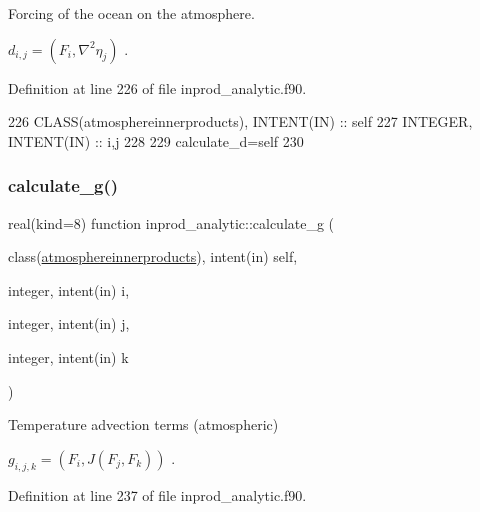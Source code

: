 Forcing of the ocean on the atmosphere. 

$ d_{i,j} = (F_i, \nabla^2 \eta_j)$ . 

Definition at line 226 of file inprod\+\_\+analytic.\+f90.


\begin{DoxyCode}
226     \textcolor{keywordtype}{CLASS}(atmosphereinnerproducts), \textcolor{keywordtype}{INTENT(IN)} :: self
227     \textcolor{keywordtype}{INTEGER}, \textcolor{keywordtype}{INTENT(IN)} :: i,j
228 
229     calculate\_d=self%
230 
\end{DoxyCode}
\mbox{\label{namespaceinprod__analytic_ae90415e2fe9f94483e4b353afc11d245}} 
\subsubsection{\texorpdfstring{calculate\+\_\+g()}{calculate\_g()}}
{\footnotesize\ttfamily real(kind=8) function inprod\+\_\+analytic\+::calculate\+\_\+g (\begin{DoxyParamCaption}\item[{class(\hyperlink{structinprod__analytic_1_1atmosphereinnerproducts}{atmosphereinnerproducts}), intent(in)}]{self,  }\item[{integer, intent(in)}]{i,  }\item[{integer, intent(in)}]{j,  }\item[{integer, intent(in)}]{k }\end{DoxyParamCaption})\hspace{0.3cm}{\ttfamily [private]}}



Temperature advection terms (atmospheric) 

$ g_{i,j,k} = (F_i, J(F_j, F_k))$ . 

Definition at line 237 of file inprod\+\_\+analytic.\+f90.


